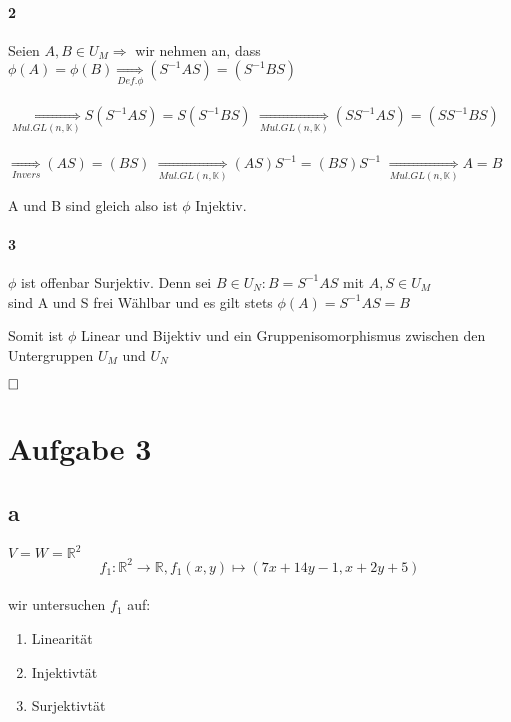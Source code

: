 \documentclass[10pt,a4paper]{article}
\begin{document}
\paragraph{2} 
Seien $A,B \in U_{M} \Rightarrow$ wir nehmen an, dass\\
$ \phi(A) = \phi(B) \underset{Def.\phi}{\Rightarrow} (S^{-1}AS)=(S^{-1}BS)$ \\\\
$ \underset{Mul. GL(n,\mathbb{K})}{\Rightarrow} S(S^{-1}AS)=S(S^{-1}BS) $
$ \underset{Mul. GL(n,\mathbb{K})}{\Rightarrow} (SS^{-1}AS)=(SS^{-1}BS) $\\\\
$ \underset{Invers}{\Rightarrow} (AS)=(BS)$
$ \underset{Mul. GL(n,\mathbb{K})}{\Rightarrow} (AS)S^{-1}=(BS)S^{-1} $
$ \underset{Mul. GL(n,\mathbb{K})}{\Rightarrow} A=B $
\begin{flushright} \checkmark \end{flushright}
A und B sind gleich also ist $\phi$ Injektiv.

\paragraph{3} 
$\phi$ ist offenbar Surjektiv. Denn sei $B\in U_{N}: B=S^{-1}AS$ mit $ A,S\in U_{M} $\\
sind A und S frei Wählbar und es gilt stets $\phi(A)=S^{-1}AS=B $
\begin{flushright} \checkmark \end{flushright}

Somit ist $\phi$ Linear und Bijektiv und ein Gruppenisomorphismus zwischen den Untergruppen 
$U_{M}$ und $U_{N} $\\ \begin{flushright} $\hfill \Box$ \end{flushright}

\newpage
\section{Aufgabe 3}
\subsection{a}
$ V=W=\mathbb{R}^2$ \\$$f_{1}:\mathbb{R}^2 \rightarrow \mathbb{R}, f_{1}(x,y)\mapsto (7x+14y-1,x+2y+5)$$\\wir untersuchen $f_{1}$ auf:
\begin{enumerate}
\item Linearität
\item Injektivtät
\item Surjektivtät
\end{enumerate}
\end{document}
